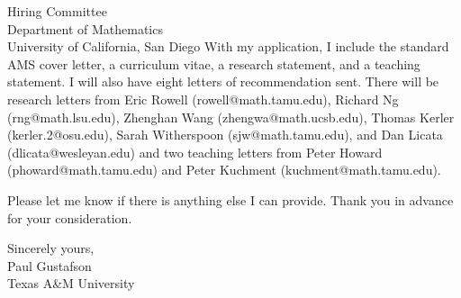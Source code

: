 \documentclass[11pt]{letter} %
\begin{document}
\begin{letter}{Hiring Committee \\
Department of Mathematics \\
University of California, San Diego}
With my application, I include the standard AMS cover letter, a curriculum vitae, a research statement, and a teaching statement. I will also have eight letters of recommendation sent. There will be research letters from Eric Rowell (rowell@math.tamu.edu),  Richard Ng (rng@math.lsu.edu), Zhenghan Wang (zhengwa@math.ucsb.edu), Thomas Kerler (kerler.2@osu.edu), Sarah Witherspoon (sjw@math.tamu.edu), and Dan Licata (dlicata@wesleyan.edu) and two teaching letters from Peter Howard (phoward@math.tamu.edu) and Peter Kuchment (kuchment@math.tamu.edu).

Please let me know if there is anything else I can provide. Thank you in
advance for your consideration.

\closing{Sincerely yours,\\ Paul Gustafson \\ Texas A\&M University}




\end{letter}
\end{document}
